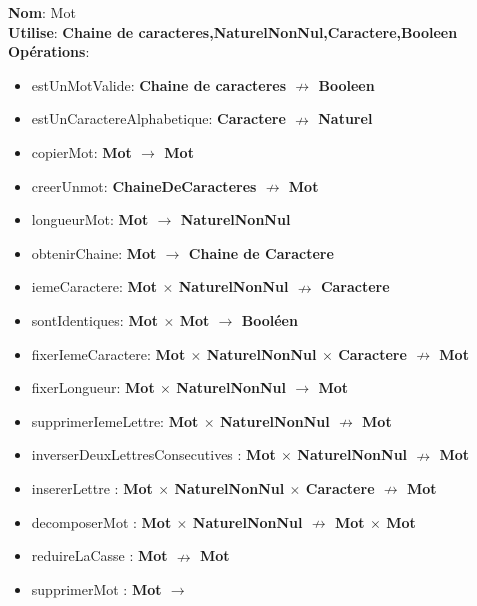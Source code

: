 
    \textbf{Nom}: Mot \\
    \textbf{Utilise}: \textbf{Chaine de caracteres,NaturelNonNul,Caractere,Booleen} \\
    \textbf{Opérations}: \begin{itemize}[label=$\ $, leftmargin=2cm, itemsep=0cm]
        \item estUnMotValide: \textbf{Chaine de caracteres $\nrightarrow $ Booleen}
        \item estUnCaractereAlphabetique: \textbf{Caractere $\nrightarrow $ Naturel}
        \item copierMot: \textbf{Mot $\rightarrow $ Mot}
        \item creerUnmot: \textbf{ChaineDeCaracteres $ \nrightarrow$ Mot}
        \item longueurMot: \textbf{Mot $ \rightarrow$  NaturelNonNul}
        \item obtenirChaine: \textbf{Mot $\rightarrow $ Chaine de Caractere}
        \item iemeCaractere: \textbf{Mot $ \times $ NaturelNonNul $ \nrightarrow$  Caractere}
        \item sontIdentiques: \textbf{Mot $ \times $ Mot $ \rightarrow$  Booléen}
    	\item fixerIemeCaractere: \textbf{Mot $ \times $ NaturelNonNul $ \times $ Caractere $\nrightarrow$ Mot}
    	\item fixerLongueur: \textbf{Mot $ \times $ NaturelNonNul $\rightarrow$ Mot}
    	\item supprimerIemeLettre: \textbf{Mot $ \times $ NaturelNonNul $\nrightarrow$ Mot}
    	\item inverserDeuxLettresConsecutives : \textbf{Mot $\times$ NaturelNonNul $\nrightarrow$ Mot}
        \item insererLettre : \textbf{Mot $\times$ NaturelNonNul $ \times $ Caractere $\nrightarrow$ Mot}
        \item decomposerMot : \textbf{Mot $\times$ NaturelNonNul $\nrightarrow$ Mot $\times$ Mot}
        \item reduireLaCasse : \textbf{Mot $\nrightarrow$ Mot}
        \item supprimerMot : \textbf{Mot $\rightarrow $}
    \end{itemize}
    
